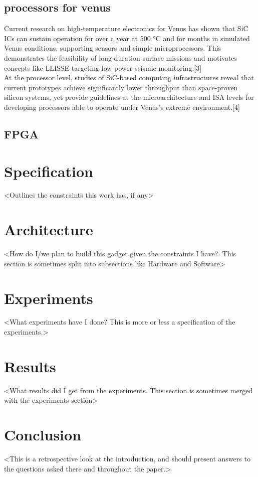 \documentclass[10pt,twocolumn]{article}
\begin{document}
\subsection{processors for venus}
Current research on high-temperature electronics for Venus has shown that SiC ICs can sustain operation for over a year at 500 °C and for months in simulated Venus conditions, supporting sensors and simple microprocessors. This demonstrates the feasibility of long-duration surface missions and motivates concepts like LLISSE targeting low-power seismic monitoring.[3] \\
At the processor level, studies of SiC-based computing infrastructures reveal that current prototypes achieve significantly lower throughput than space-proven silicon systems, yet provide guidelines at the microarchitecture and ISA levels for developing processors able to operate under Venus’s extreme environment.[4]\\
\subsection{FPGA}

\section{Specification}
<Outlines the constraints this work has, if any>\\

\section{Architecture}
<How do I/we plan to build this gadget given the constraints I have?. This section is sometimes split into subsections like Hardware and Software>

\section{Experiments}
<What experiments have I done? This is more or less a specification of the experiments.>

\section{Results}
<What results did I get from the experiments. This section is sometimes merged with the experiments section>

\section{Conclusion}
<This is a retrospective look at the introduction, and should present answers to the questions asked there and throughout the paper.>
\end{document}
